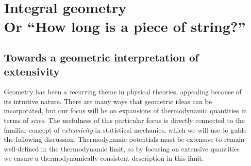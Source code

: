 \section[Integral geometry. Or ``How long is a piece of string?'']{Integral geometry\\ {\large Or ``How long is a piece of string?''}}
\label{sec:integral-geometry}

\subsection{Towards a geometric interpretation of extensivity}

Geometry has been a recurring theme in physical theories, appealing because of its intuitive nature.
There are many ways that geometric ideas can be incorporated, but our focus will be on expansions of thermodynamic quantities in terms of \emph{sizes}.
The usefulness of this particular focus is directly connected to the familiar concept of \emph{extensivity} in statistical mechanics, which we will use to guide the following discussion.
Thermodynamic potentials must be extensive to remain well-defined in the thermodynamic limit,
so by focusing on extensive quantities we ensure a thermodynamically consistent description in this limit.

